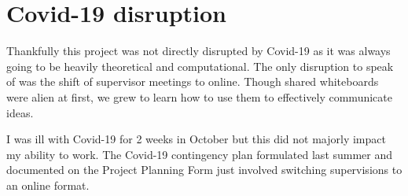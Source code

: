 \section{Covid-19 disruption}

Thankfully this project was not directly disrupted by Covid-19 as it was always going to be heavily theoretical and computational. The only disruption to speak of was the shift of supervisor meetings to online. Though shared whiteboards were alien at first, we grew to learn how to use them to effectively communicate ideas.

I was ill with Covid-19 for 2 weeks in October but this did not majorly impact my ability to work. The Covid-19 contingency plan formulated last summer and documented on the Project Planning Form just involved switching supervisions to an online format.